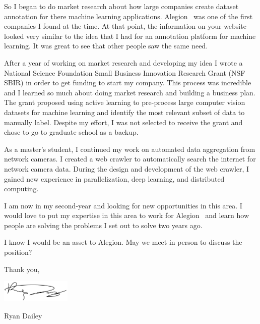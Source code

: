 \documentclass[10pt]{article}
\newlength{\cvaftersectionskipamount}
\newcommand{\company}{Alegion}
\newcommand{\job}{Machine Learning Software Engineer}
\begin{document}
So I began to do market research about how large companies create dataset annotation for there machine learning applications. \company~ was one of the first companies I found at the time. At that point, the information on your website looked very similar to the idea that I had for an annotation platform for machine learning. It was great to see that other people saw the same need. 

After a year of working on market research and developing my idea I wrote a National Science Foundation Small Business Innovation Research Grant (NSF SBIR) in order to get funding to start my company. This process was incredible and I learned so much about doing market research and building a business plan. The grant proposed using active learning to pre-process large computer vision datasets for machine learning and identify the most relevant subset of data to manually label. Despite my effort, I was not selected to receive the grant and chose to go to graduate school as a backup. 

As a master's student, I continued my work on automated data aggregation from network cameras. I created a web crawler to automatically search the internet for network camera data. During the design and development of the web crawler, I gained new experience in parallelization, deep learning, and distributed computing.

I am now in my second-year and looking for new opportunities in this area. I would love to put my expertise in this area to work for \company~ and learn how people are solving the problems I set out to solve two years ago. 

\vspace{\cvaftersectionskipamount}

\noindent I know I would be an asset to \company. 
May we meet in person to discuss the position?  

\vspace{2\cvaftersectionskipamount}

\noindent Thank you, 

\vspace{\cvaftersectionskipamount}

\includegraphics[height=30pt]{Signature.pdf}

Ryan Dailey 
\end{document}
